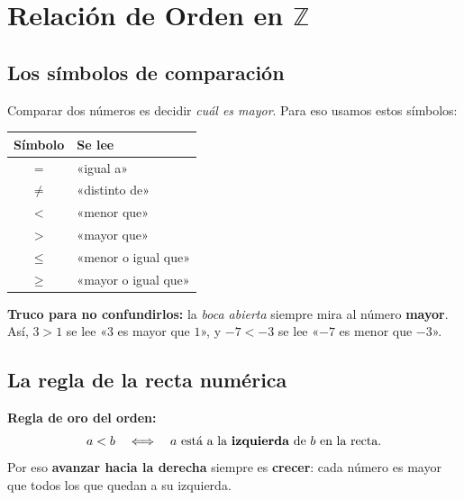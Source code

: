 \documentclass[12pt, letterpaper]{article}
\newcommand{\Z}{\mathbb{Z}}
\begin{document}
\newpage

\section{Relación de Orden en $\Z$}

\subsection{Los símbolos de comparación}

Comparar dos números es decidir \emph{cuál es mayor}. Para eso usamos estos símbolos:

\begin{cuadroteoria}
  \begin{center}
    \renewcommand{\arraystretch}{1.25}
    \begin{tabular}{cl}
      \toprule
      \textbf{Símbolo} & \textbf{Se lee} \\
      \midrule
      $=$    & «igual a» \\
      $\neq$ & «distinto de» \\
      $<$    & «menor que» \\
      $>$    & «mayor que» \\
      $\leq$ & «menor o igual que» \\
      $\geq$ & «mayor o igual que» \\
      \bottomrule
    \end{tabular}
  \end{center}

  \smallskip
  \noindent \textbf{Truco para no confundirlos:} la \emph{boca abierta} siempre mira al número \textbf{mayor}. Así, $3 > 1$ se lee «$3$ es mayor que $1$», y $-7 < -3$ se lee «$-7$ es menor que $-3$».
\end{cuadroteoria}

\subsection{La regla de la recta numérica}

\begin{cuadroteoria}
  \textbf{Regla de oro del orden:}
  \[
    a < b \quad \Longleftrightarrow \quad a \text{ está a la \textbf{izquierda} de } b \text{ en la recta.}
  \]
  Por eso \textbf{avanzar hacia la derecha} siempre es \textbf{crecer}: cada número es mayor que todos los que quedan a su izquierda.
\end{cuadroteoria}
\end{document}
